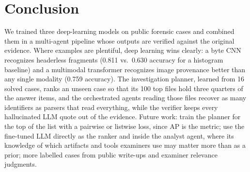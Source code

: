 \documentclass[conference]{IEEEtran}
\begin{document}
\section{Conclusion}
We trained three deep-learning models on public forensic cases and combined them in a multi-agent pipeline whose
outputs are verified against the original evidence. Where examples are plentiful, deep learning wins clearly: a byte
CNN recognizes headerless fragments (0.811 vs.\ 0.630 accuracy for a histogram baseline) and a multimodal transformer
recognizes image provenance better than any single modality (0.759 accuracy). The investigation planner, learned from
16 solved cases, ranks an unseen case so that its 100 top files hold three quarters of the answer items, and the
orchestrated agents reading those files recover as many identifiers as parsers that read everything, while the
verifier keeps every hallucinated LLM quote out of the evidence. Future work: train the planner for the top of the
list with a pairwise or listwise loss, since AP is the metric; use the fine-tuned LLM directly as the ranker and
inside the analyst agent, where its knowledge of which artifacts and tools examiners use may matter more than as a
prior; more labelled cases from public write-ups and examiner relevance judgments.
\end{document}
